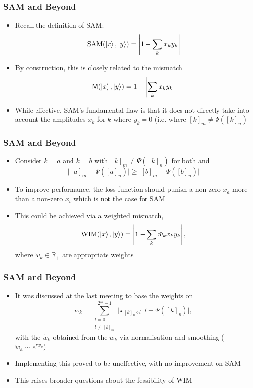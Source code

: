 \documentclass{beamer}
\begin{document}
\begin{frame}
\frametitle{SAM and Beyond}
\begin{itemize}
\item Recall the definition of \alert{SAM}:
\begin{equation}
\text{SAM}(\ket{x}, \ket{y}) = \left\vert 1 - \sum_k x_k y_k \right\vert 
\end{equation}
\item By construction, this is closely related to the \alert{mismatch} 
\begin{equation}
\mathsf{M}(\ket{x}, \ket{y}) = 1 - \left|\sum_k x_k y_k\right|
\end{equation}
\item While effective, SAM's \alert{fundamental flaw} is that it does not directly take into account the amplitudes $x_k$ for $k$ where $y_k =0$ (i.e. where $[k]_m \neq \Psi([k]_n)$
\end{itemize}
\end{frame}

\begin{frame}
\frametitle{SAM and Beyond}
\begin{itemize}
\item Consider $k=a$ and $k=b$ with $[k]_m \neq \Psi([k]_n)$ for both and 
\begin{equation}
\Big|[a]_m - \Psi([a]_n) \Big| \geq \Big|[b]_m - \Psi([b]_n) \Big| 
\end{equation}
\item To improve performance, the loss function should punish a non-zero $x_a$ more than a non-zero $x_b$ which is not the case for SAM
\item This could be achieved via a \alert{weighted mismatch}, 
\begin{equation}
\text{WIM}(\ket{x}, \ket{y}) = \left\vert 1 - \sum_k \tilde{w}_k x_k y_k \right\vert, 
\end{equation}
where $\tilde{w}_k \in \mathbb{R}_+$ are appropriate weights
\end{itemize}
\end{frame}

\begin{frame}
\frametitle{SAM and Beyond}
\begin{itemize}
\item It was discussed at the last meeting to base the weights on
\begin{equation}
w_k = \sum^{2^m -1}_{\substack{l=0, \\ l \neq [k]_m}} \Big|x_{[k]_n \diamond l} \Big| \Big| l - \Psi([k]_n) \Big|,
\end{equation}
with the $\tilde{w}_k$ obtained from the $w_k$ via normalisation and smoothing ($\tilde{w}_k \sim e^{\tau w_k}$)
\item Implementing this \alert{proved to be uneffective}, with no improvement on SAM  
\item This raises broader questions about the \alert{feasibility of WIM}
\end{itemize}
\end{frame}
\end{document}
